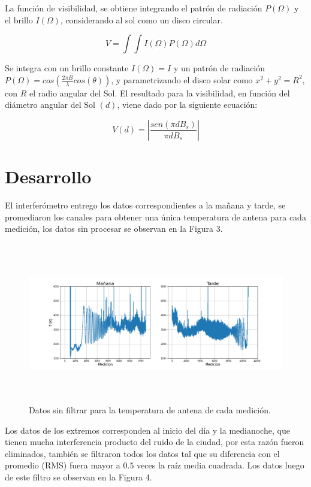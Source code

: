 \documentclass[letterpaper,oneside]{article}
\begin{document}
La función de visibilidad, se obtiene integrando el patrón de radiación $P(\Omega)$ y el brillo $I(\Omega)$, considerando al sol como un disco circular.

$$V = \int \int I(\Omega)P(\Omega)d\Omega$$

Se integra con un brillo constante $I(\Omega)=I$ y un patrón de radiación $P(\Omega)=cos(\frac{2\pi B}{\lambda}cos(\theta))$, y parametrizando el disco solar como $x^2 + y^2 = R^2$, con $R$  el radio angular del Sol. El resultado para la visibilidad, en función del diámetro angular del Sol $(d)$, viene dado por la siguiente ecuación:

\begin{equation}
    V(d) = \left |\frac{sen(\pi d B_s)}{\pi d B_s} \right |
\end{equation}

\section{Desarrollo}
El interferómetro entrego los datos correspondientes a la mañana y tarde, se promediaron los canales para obtener una única temperatura de antena para cada medición, los datos sin procesar se observan en la Figura 3.\\

\begin{figure}
  \centering
  \includegraphics[height=7cm]{../graficos/rawdata.png}
  \caption{Datos sin filtrar para la temperatura de antena de cada medición.}
\end{figure}

Los datos de los extremos corresponden al inicio del día y la medianoche, que tienen mucha interferencia producto del ruido de la ciudad, por esta razón fueron eliminados, también se filtraron todos los datos tal que su diferencia con el promedio (RMS) fuera mayor a $0.5$ veces la raíz media cuadrada. Los datos luego de este filtro se observan en la Figura 4.\\
\end{document}

